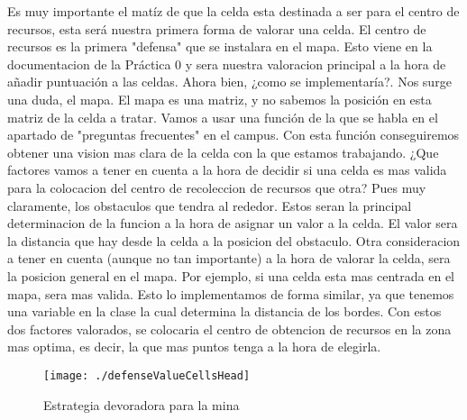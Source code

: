     Es muy importante el matíz de que la celda esta destinada a ser para el centro de recursos, esta será nuestra primera forma de valorar
una celda. El centro de recursos es la primera "defensa" que se instalara en el mapa. Esto viene en la documentacion de la Práctica 0 y sera nuestra valoracion principal a la hora de añadir puntuación
a las celdas. 
    Ahora bien, ¿como se implementaría?. Nos surge una duda, el mapa. El mapa es una matriz, y no sabemos la posición en esta matriz de la celda
a tratar. Vamos a usar una función de la que se habla en el apartado de "preguntas frecuentes" en el campus. Con esta función conseguiremos
obtener una vision mas clara de la celda con la que estamos trabajando.
    ¿Que factores vamos a tener en cuenta a la hora de decidir si una celda es mas valida para la colocacion del centro de recoleccion 
de recursos que otra? Pues muy claramente, los obstaculos que tendra al rededor. Estos seran la principal determinacion de la funcion
a la hora de asignar un valor a la celda. El valor sera la distancia que hay desde la celda a la posicion del obstaculo. Otra consideracion
a tener en cuenta (aunque no tan importante) a la hora de valorar la celda, sera la posicion general en el mapa. Por ejemplo, si una celda
esta mas centrada en el mapa, sera mas valida. Esto lo implementamos de forma similar, ya que tenemos una variable en la clase la cual
determina la distancia de los bordes. 
    Con estos dos factores valorados, se colocaria el centro de obtencion de recursos en la zona mas optima, es decir, la que mas puntos
tenga a la hora de elegirla.
\begin{figure}
\centering
\texttt{[image: ./defenseValueCellsHead]} %
\caption{Estrategia devoradora para la mina}
\label{fig:defenseValueCellsHead}
\end{figure}